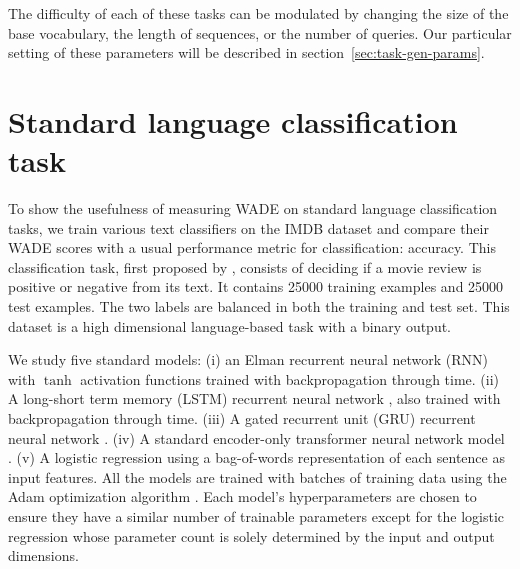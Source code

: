 The difficulty of each of these tasks can be modulated by changing the size of the
base vocabulary, the length of sequences, or the number of queries. Our particular setting of these parameters will be described in section~\ref{sec:task-gen-params}.

\section{Standard language classification task}

To show the usefulness of measuring \ac{WADE} on standard language
classification tasks, we train various text classifiers on the IMDB dataset and
compare their \ac{WADE} scores with a usual performance metric for
classification: accuracy. This classification task, first proposed by
\parencite{maassRealTimeComputingStable2002}, consists of deciding if a movie review
is positive or negative from its text. It contains 25000 training examples and
25000 test examples. The two labels are balanced in both the training and test
set. This dataset is a high dimensional language-based task with a binary
output.

We study five standard models: (i) an Elman recurrent neural network (RNN)
\parencite{elmanFindingStructureTime1990} with $\tanh$ activation functions trained
with backpropagation through time. (ii) A long-short term memory (LSTM)
recurrent neural network \parencite{hochreiterLongShortTermMemory1997}, also trained
with backpropagation through time. (iii) A gated recurrent unit (GRU) recurrent
neural network \parencite{choPropertiesNeuralMachine2014}. (iv) A standard
encoder-only transformer neural network model \parencite{vaswaniAttentionAllYou2017}.
(v) A logistic regression using a bag-of-words representation of each sentence
as input features. All the models are trained with batches of training data
using the Adam optimization algorithm \parencite{kingmaAdamMethodStochastic2015}.
Each model's hyperparameters are chosen to ensure they have a similar number of
trainable parameters except for the logistic regression whose parameter count is
solely determined by the input and output dimensions.

